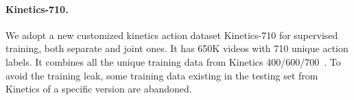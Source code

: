 \paragraph{Kinetics-710.} \label{k710}
We adopt a new customized kinetics action dataset Kinetics-710 \cite{uniformerv2} for supervised training, both separate and joint ones. It has 650K videos with 710 unique action labels. It combines all the unique training data from Kinetics 400/600/700~\cite{k400,k600,k700}. To avoid the training leak, some training data existing in the testing set from Kinetics of a specific version are abandoned.
